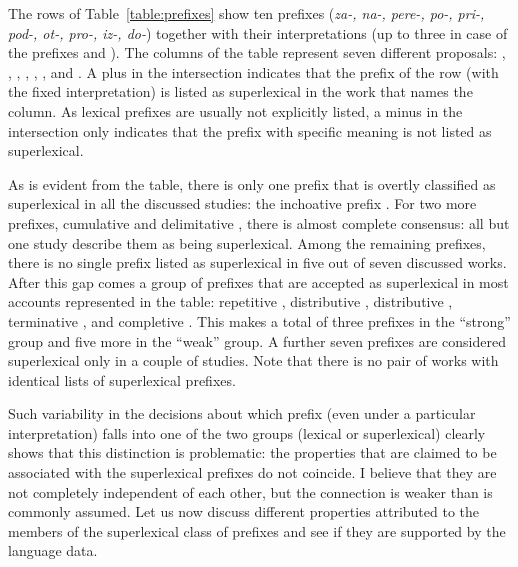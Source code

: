 The rows of Table~\ref{table:prefixes} show ten prefixes (\textit{za-, na-, pere-, po-, pri-, pod-, ot-, pro-, iz-, do-}) together with their interpretations (up to three in case of the prefixes  and ). The columns of the table represent seven different proposals: \citealt{Babko-Malaya:99}, \citealt{Svenonius:04a}, \citealt{Svenonius:04b}, \citealt{Ramchand:04}, \citealt{Romanova:06}, \citealt{Tatevosov:09}, and \citealt{Svenonius:12}. A plus in the intersection indicates that the prefix of the row (with the fixed interpretation) is listed as superlexical in the work that names the column. As lexical prefixes are usually not explicitly listed, a minus in the intersection only indicates that the prefix with specific meaning is not listed as superlexical.

As is evident from the table, there is only one prefix that is overtly classified as superlexical in all the discussed studies: the inchoative prefix . For two more prefixes, cumulative  and delimitative , there is almost complete consensus: all but one study describe them as being superlexical. Among the remaining prefixes, there is no single prefix listed as superlexical in five out of seven discussed works. After this gap comes a group of prefixes that are accepted as superlexical in most accounts represented in the table: repetitive , distributive , distributive , terminative , and completive . This makes a total of three prefixes in the ``strong'' group and five more in the ``weak'' group. A further seven prefixes are considered superlexical only in a couple of studies. Note that there is no pair of works with identical lists of superlexical prefixes. 

Such variability in the decisions about which prefix (even under a particular interpretation) falls into one of the two groups (lexical or superlexical) clearly shows that this distinction is problematic: the properties that are claimed to be associated with the superlexical prefixes do not coincide. I believe that they are not completely independent of each other, but the connection is weaker than is commonly assumed. Let us now discuss different properties attributed to the members of the superlexical class of prefixes and see if they are supported by the language data.




